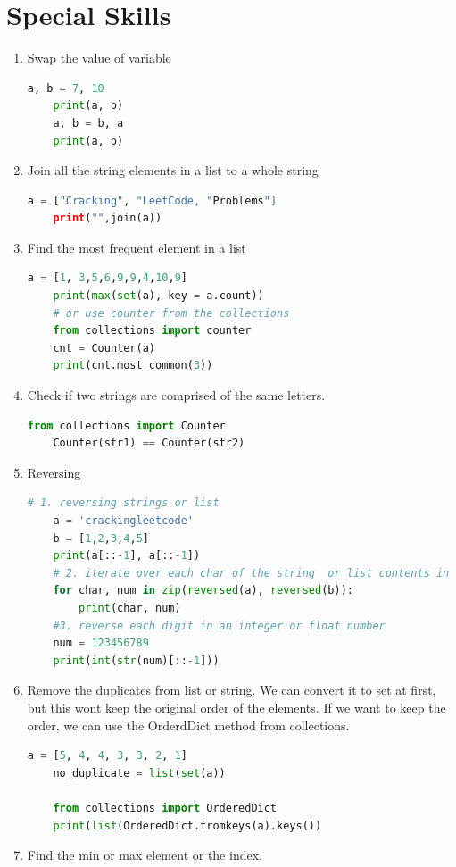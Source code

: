 \documentclass[../main.tex]{subfiles}
\begin{document}
\section{Special Skills}
\begin{enumerate}
    \item Swap the value of variable
    \begin{lstlisting}[language=Python]
    a, b = 7, 10
    print(a, b)
    a, b = b, a
    print(a, b)
    \end{lstlisting}
    \item Join all the string elements in a list to a whole string
    \begin{lstlisting}[language=Python]
    a = ["Cracking", "LeetCode, "Problems"]
    print("",join(a))
    \end{lstlisting}
    \item Find the most frequent element in a list
    \begin{lstlisting}[language=Python]
    a = [1, 3,5,6,9,9,4,10,9]
    print(max(set(a), key = a.count))
    # or use counter from the collections
    from collections import counter
    cnt = Counter(a)
    print(cnt.most_common(3))
    \end{lstlisting}
    \item Check if two strings are comprised of the same letters. 
    \begin{lstlisting}[language=Python]
    from collections import Counter
    Counter(str1) == Counter(str2)
    \end{lstlisting}
    \item Reversing
    \begin{lstlisting}[language=Python]
    # 1. reversing strings or list
    a = 'crackingleetcode'
    b = [1,2,3,4,5]
    print(a[::-1], a[::-1])
    # 2. iterate over each char of the string  or list contents in reverse order efficiently, here we use zip to 
    for char, num in zip(reversed(a), reversed(b)):
        print(char, num)
    #3. reverse each digit in an integer or float number
    num = 123456789
    print(int(str(num)[::-1]))
    \end{lstlisting}
    \item Remove the duplicates from list or string. We can convert it to set at first, but this wont keep the original order of the elements. If we want to keep the order, we can use the OrderdDict method from collections. 
    \begin{lstlisting}[language=Python]
    a = [5, 4, 4, 3, 3, 2, 1]
    no_duplicate = list(set(a))
    
    from collections import OrderedDict
    print(list(OrderedDict.fromkeys(a).keys())
    \end{lstlisting}
    \item Find the min or max element or the index. 
\end{enumerate}
\end{document}
